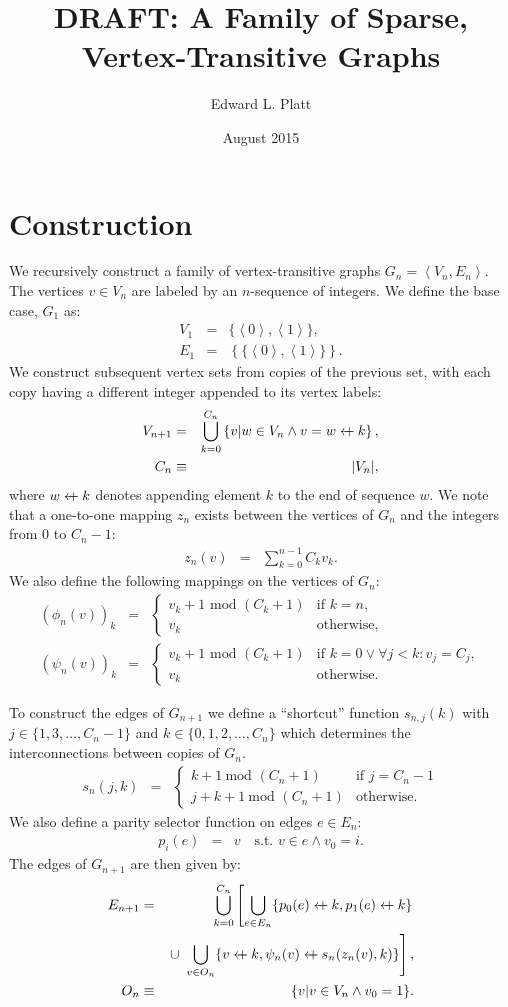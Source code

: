 \documentclass{article}
\title{DRAFT: A Family of Sparse, Vertex-Transitive Graphs}
\author{Edward L. Platt}
\date{August 2015}
\newcommand{\la}{\left\langle}
\newcommand{\ra}{\right\rangle}
\newcommand{\beq}{\begin{eqnarray}}
\newcommand{\eeq}{\end{eqnarray}}
\newcommand{\append}{\leftarrow{\mkern-18mu}{+}\:}
\begin{document}
\maketitle

\section{Construction}

We recursively construct a family of vertex-transitive graphs
$G_n = \la V_n, E_n \ra$.
The vertices $v \in V_n$ are labeled by an $n$-sequence of integers.
We define the base case, $G_1$ as:
\beq
V_1 &=& \{\la{0}\ra,\la{1}\ra\}, \\
E_1 &=& \left\{\{\la{0}\ra,\la{1}\ra\}\right\}.
\eeq
We construct subsequent vertex sets from copies of the previous set,
with each copy having a different integer appended to its vertex labels:
\beq
\label{eq:vn}
V_{n+1} &=& \bigcup_{k = 0}^{C_n}
\left\{ v | w \in V_n \land v = w \append k \right\},
\\
C_n &\equiv& |V_n|,
\eeq
where $w \append k$ denotes appending element $k$ to the end of sequence $w$.
We note that a one-to-one mapping $z_n$ exists between the vertices of $G_n$ and the
integers from $0$ to $C_n - 1$:
\beq
z_n(v) &=& \sum_{k=0}^{n-1} C_k v_k.
\eeq
We also define the following mappings on the vertices of $G_n$:
\beq
(\phi_n(v))_k
&=&
\begin{cases}
v_k + 1 \mbox{ mod } (C_k + 1) & \mbox{if } k = n,
\\
v_k & \mbox{otherwise},
\end{cases}
\\
(\psi_n(v))_k
&=&
\begin{cases}
v_k + 1 \mbox{ mod } (C_k + 1)
& \mbox{if } k = 0 \lor \forall j < k: v_j = C_j, \\
v_k & \mbox{otherwise}.
\end{cases}
\eeq

To construct the edges of $G_{n+1}$ we define a ``shortcut'' function $s_{n,j}(k)$
with $j \in \{1, 3, \ldots, C_n - 1\}$ and $k \in \{0, 1, 2, \ldots, C_n\}$ which
determines the interconnections between copies of $G_n$.
\beq
\label{eq:shortcut}
s_{n}(j, k)
&=&
\begin{cases}
k + 1 \ \mbox{mod } (C_n + 1)
&
\mbox{if } j = C_n - 1
\\
j + k + 1 \ \mbox{mod } (C_n + 1)
&
\mbox{otherwise}.
\end{cases}
\eeq
We also define a parity selector function on edges $e \in E_n$:
\beq
p_i(e)
&=&
v \quad \mbox{s.t. } v \in e \land v_0 = i.
\eeq
The edges of $G_{n+1}$ are then given by:
\beq
\label{eq:edges}
E_{n+1}
&=&
\bigcup_{k=0}^{C_n}
\left[
\bigcup_{e \in E_n} \{ p_0(e) \append k, p_1(e) \append k\}
\right.
\\ & &
\left.
\cup \ 
\bigcup_{v \in O_n} \{ v \append k, \psi_n(v) \append s_n(z_n(v), k) \}
\right],
\\
O_n &\equiv& \{v | v \in V_n \land v_0 = 1 \}.
\eeq
\end{document}
